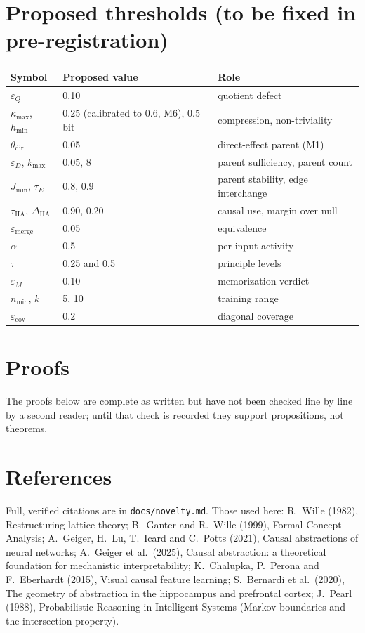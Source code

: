 \documentclass[11pt]{article}
\theoremstyle{definition}
\theoremstyle{plain}
\theoremstyle{remark}
\newcommand{\IIA}{\mathrm{IIA}}
\begin{document}
\section*{Proposed thresholds (to be fixed in pre-registration)}

\begin{tabular}{lll}
\toprule
Symbol & Proposed value & Role \\
\midrule
$\varepsilon_Q$ & 0.10 & quotient defect \\
$\kappa_{\max}$, $h_{\min}$ & 0.25 (calibrated to 0.6, M6), 0.5 bit & compression, non-triviality \\
$\theta_{\mathrm{dir}}$ & 0.05 & direct-effect parent (M1) \\
$\varepsilon_D$, $k_{\max}$ & 0.05, 8 & parent sufficiency, parent count \\
$J_{\min}$, $\tau_E$ & 0.8, 0.9 & parent stability, edge interchange \\
$\tau_{\IIA}$, $\Delta_{\IIA}$ & 0.90, 0.20 & causal use, margin over null \\
$\varepsilon_{\mathrm{merge}}$ & 0.05 & equivalence \\
$\alpha$ & 0.5 & per-input activity \\
$\tau$ & 0.25 and 0.5 & principle levels \\
$\varepsilon_M$ & 0.10 & memorization verdict \\
$n_{\min}$, $k$ & 5, 10 & training range \\
$\varepsilon_{\mathrm{cov}}$ & 0.2 & diagonal coverage \\
\bottomrule
\end{tabular}

\appendix
\section{Proofs}
The proofs below are complete as written but have not been checked line by
line by a second reader; until that check is recorded they support
propositions, not theorems.











\section*{References}
Full, verified citations are in \texttt{docs/novelty.md}. Those used here:
R.~Wille (1982), Restructuring lattice theory; B.~Ganter and R.~Wille (1999),
Formal Concept Analysis; A.~Geiger, H.~Lu, T.~Icard and C.~Potts (2021),
Causal abstractions of neural networks; A.~Geiger et al.\ (2025), Causal
abstraction: a theoretical foundation for mechanistic interpretability;
K.~Chalupka, P.~Perona and F.~Eberhardt (2015), Visual causal feature
learning; S.~Bernardi et al.\ (2020), The geometry of abstraction in the
hippocampus and prefrontal cortex; J.~Pearl (1988), Probabilistic Reasoning
in Intelligent Systems (Markov boundaries and the intersection property).
\end{document}
